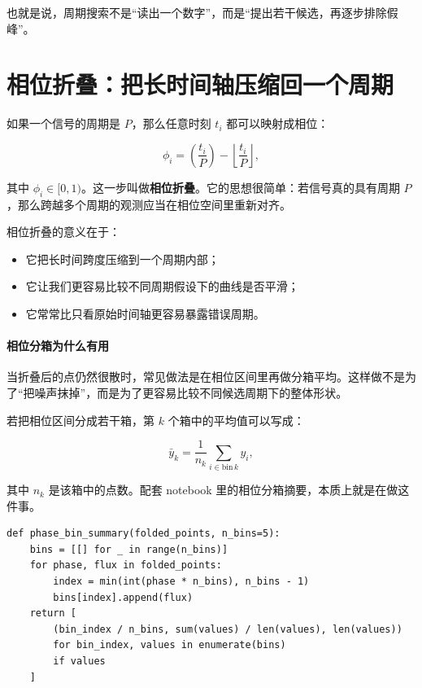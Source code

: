 也就是说，周期搜索不是“读出一个数字”，而是“提出若干候选，再逐步排除假峰”。

\section{相位折叠：把长时间轴压缩回一个周期}

如果一个信号的周期是 $P$，那么任意时刻 $t_i$ 都可以映射成相位：

\[
\phi_i = \left(\frac{t_i}{P}\right) - \left\lfloor \frac{t_i}{P} \right\rfloor,
\]

其中 $\phi_i \in [0,1)$。这一步叫做\textbf{相位折叠}。它的思想很简单：若信号真的具有周期 $P$，那么跨越多个周期的观测应当在相位空间里重新对齐。

相位折叠的意义在于：

\begin{itemize}
    \item 它把长时间跨度压缩到一个周期内部；
    \item 它让我们更容易比较不同周期假设下的曲线是否平滑；
    \item 它常常比只看原始时间轴更容易暴露错误周期。
\end{itemize}

\paragraph{相位分箱为什么有用}

当折叠后的点仍然很散时，常见做法是在相位区间里再做分箱平均。这样做不是为了“把噪声抹掉”，而是为了更容易比较不同候选周期下的整体形状。

若把相位区间分成若干箱，第 $k$ 个箱中的平均值可以写成：

\[
\bar{y}_k = \frac{1}{n_k}\sum_{i \in \mathrm{bin}\,k} y_i,
\]

其中 $n_k$ 是该箱中的点数。配套 notebook 里的相位分箱摘要，本质上就是在做这件事。

\begin{examplebox}[最小相位分箱统计]
\begin{lstlisting}[style=pythonstyle]
def phase_bin_summary(folded_points, n_bins=5):
    bins = [[] for _ in range(n_bins)]
    for phase, flux in folded_points:
        index = min(int(phase * n_bins), n_bins - 1)
        bins[index].append(flux)
    return [
        (bin_index / n_bins, sum(values) / len(values), len(values))
        for bin_index, values in enumerate(bins)
        if values
    ]
\end{lstlisting}
\end{examplebox}

